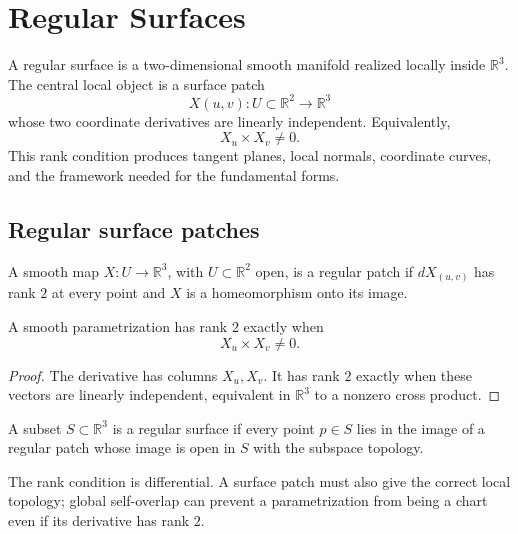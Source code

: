 \chapter{Regular Surfaces}
\label{ch:vii14-regular-surfaces}

A regular surface is a two-dimensional smooth manifold realized locally inside \(\mathbb R^3\).  The central local object is a surface patch
\[
X(u,v):U\subset\mathbb R^2\longrightarrow\mathbb R^3
\]
whose two coordinate derivatives are linearly independent.  Equivalently,
\[
\boxed{X_u\times X_v\neq0.}
\]
This rank condition produces tangent planes, local normals, coordinate curves, and the framework needed for the fundamental forms.

\section{Regular surface patches}
\begin{definition}\label{def:vii14-patch}
A smooth map \(X:U\to\mathbb R^3\), with \(U\subset\mathbb R^2\) open, is a regular patch if \(dX_{(u,v)}\) has rank \(2\) at every point and \(X\) is a homeomorphism onto its image.
\end{definition}

\begin{proposition}\label{prop:vii14-cross-criterion}
A smooth parametrization has rank \(2\) exactly when
\[
X_u\times X_v\neq0.
\]
\end{proposition}
\begin{proof}
The derivative has columns \(X_u,X_v\).  It has rank \(2\) exactly when these vectors are linearly independent, equivalent in \(\mathbb R^3\) to a nonzero cross product.
\end{proof}

\begin{definition}\label{def:vii14-regular-surface}
A subset \(S\subset\mathbb R^3\) is a regular surface if every point \(p\in S\) lies in the image of a regular patch whose image is open in \(S\) with the subspace topology.
\end{definition}

\begin{warning}\label{warn:vii14-rank-topology}
The rank condition is differential.  A surface patch must also give the correct local topology; global self-overlap can prevent a parametrization from being a chart even if its derivative has rank \(2\).
\end{warning}

